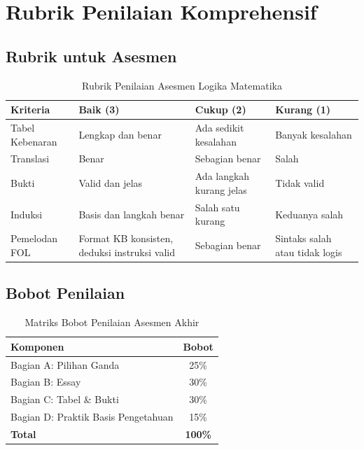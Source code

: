 \section{Rubrik Penilaian Komprehensif}

\subsection{Rubrik untuk Asesmen}

\begin{table}[htbp]
\centering
\small
\begin{tabular}{|>{\raggedright\arraybackslash}p{2.5cm}|>{\raggedright\arraybackslash}p{3cm}|>{\raggedright\arraybackslash}p{3cm}|>{\raggedright\arraybackslash}p{2.5cm}|}
\hline
\textbf{Kriteria} & \textbf{Baik (3)} & \textbf{Cukup (2)} & \textbf{Kurang (1)} \\
\hline
Tabel Kebenaran & Lengkap dan benar & Ada sedikit kesalahan & Banyak kesalahan \\
\hline
Translasi & Benar & Sebagian benar & Salah \\
\hline
Bukti & Valid dan jelas & Ada langkah kurang jelas & Tidak valid \\
\hline
Induksi & Basis dan langkah benar & Salah satu kurang & Keduanya salah \\
\hline
Pemelodan FOL & Format KB konsisten, deduksi instruksi valid & Sebagian benar & Sintaks salah atau tidak logis \\
\hline
\end{tabular}
\caption{Rubrik Penilaian Asesmen Logika Matematika}
\end{table}

\subsection{Bobot Penilaian}

\begin{table}[htbp]
\centering
\begin{tabular}{|l|c|}
\hline
\textbf{Komponen} & \textbf{Bobot} \\
\hline
Bagian A: Pilihan Ganda & 25\% \\
\hline
Bagian B: Essay & 30\% \\
\hline
Bagian C: Tabel \& Bukti & 30\% \\
\hline
Bagian D: Praktik Basis Pengetahuan & 15\% \\
\hline
\textbf{Total} & \textbf{100\%} \\
\hline
\end{tabular}
\caption{Matriks Bobot Penilaian Asesmen Akhir}
\end{table}
